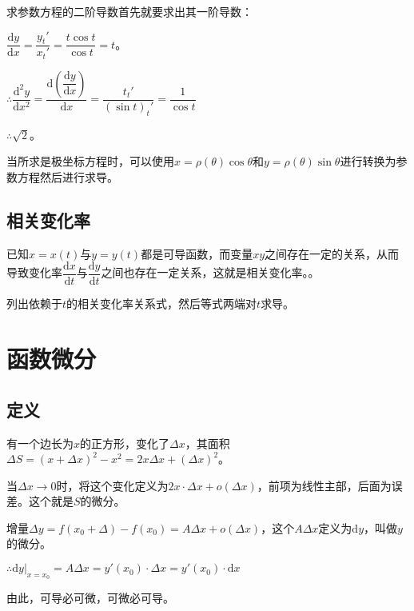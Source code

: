 \documentclass[UTF8, 12pt]{ctexart}
\begin{document}
求参数方程的二阶导数首先就要求出其一阶导数：\medskip

$\dfrac{\textrm{d}y}{\textrm{d}x}=\dfrac{y_t'}{x_t'}=\dfrac{t\cos t}{\cos t}=t$。\medskip

$\therefore\dfrac{\textrm{d}^2y}{\textrm{d}x^2}=\dfrac{\textrm{d}\left(\dfrac{\textrm{d}y}{\textrm{d}x}\right)}{\textrm{d}x}=\dfrac{t_t'}{(\sin t)_t'}=\dfrac{1}{\cos t}$\medskip

$\therefore \sqrt{2}$。

当所求是极坐标方程时，可以使用$x=\rho(\theta)\cos\theta$和$y=\rho(\theta)\sin\theta$进行转换为参数方程然后进行求导。

\subsection{相关变化率}

已知$x=x(t)$与$y=y(t)$都是可导函数，而变量$xy$之间存在一定的关系，从而导致变化率$\dfrac{\textrm{d}x}{\textrm{d}t}$与$\dfrac{\textrm{d}y}{\textrm{d}t}$之间也存在一定关系，这就是相关变化率。。

列出依赖于$t$的相关变化率关系式，然后等式两端对$t$求导。

\section{函数微分}

\subsection{定义}

有一个边长为$x$的正方形，变化了$\Delta x$，其面积$\Delta S=(x+\Delta x)^2-x^2=2x\Delta x+(\Delta x)^2$。

当$\Delta x\to 0$时，将这个变化定义为$2x\cdot\Delta x+o(\Delta x)$，前项为线性主部，后面为误差。这个就是$S$的微分。

增量$\Delta y=f(x_0+\Delta)-f(x_0)=A\Delta x+o(\Delta x)$，这个$A\Delta x$定义为$\textrm{d}y$，叫做$y$的微分。

$\therefore \textrm{d}y\vert_{x=x_0}=A\Delta x=y'(x_0)\cdot\Delta x=y'(x_0)\cdot\textrm{d}x$

由此，可导必可微，可微必可导。
\end{document}
